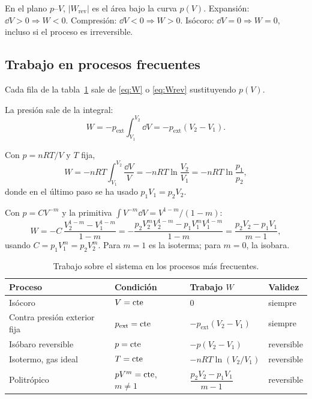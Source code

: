 \begin{observacion}
En el plano $p$--$V$, $|W_{\mathrm{rev}}|$ es el área bajo la curva $p(V)$. Expansión: $\dd V>0\Rightarrow W<0$.
Compresión: $\dd V<0\Rightarrow W>0$. Isócoro: $\dd V=0\Rightarrow W=0$, incluso si el proceso es irreversible.
\end{observacion}

\subsection{Trabajo en procesos frecuentes}

Cada fila de la tabla~\ref{tab:trabajos} sale de \eqref{eq:W} o \eqref{eq:Wrev} sustituyendo $p(V)$.

 La presión sale de la integral:
\[
  W=-p_{\mathrm{ext}}\int_{V_1}^{V_2}\dd V=-p_{\mathrm{ext}}(V_2-V_1).
\]

 Con $p=nRT/V$ y $T$ fija,
\[
  W=-nRT\int_{V_1}^{V_2}\frac{\dd V}{V}=-nRT\ln\frac{V_2}{V_1}=-nRT\ln\frac{p_1}{p_2},
\]
donde en el último paso se ha usado $p_1V_1=p_2V_2$.

 Con $p=CV^{-m}$ y la primitiva $\int V^{-m}\dd V=V^{1-m}/(1-m)$:
\[
  W=-C\,\frac{V_2^{1-m}-V_1^{1-m}}{1-m}
   =-\frac{p_2V_2^{m}V_2^{1-m}-p_1V_1^{m}V_1^{1-m}}{1-m}
   =\frac{p_2V_2-p_1V_1}{m-1},
\]
usando $C=p_1V_1^m=p_2V_2^m$. Para $m=1$ es la isoterma; para $m=0$, la isobara.

\begin{table}[htbp]
\centering
\caption{Trabajo sobre el sistema en los procesos más frecuentes.}
\label{tab:trabajos}
\small
\renewcommand{\arraystretch}{1.55}
\begin{tabular}{llll}
\toprule
Proceso & Condición & Trabajo $W$ & Validez\\
\midrule
Isócoro & $V=\mathrm{cte}$ & $0$ & siempre\\
Contra presión exterior fija & $p_{\mathrm{ext}}=\mathrm{cte}$ & $-p_{\mathrm{ext}}(V_2-V_1)$ & siempre\\
Isóbaro reversible & $p=\mathrm{cte}$ & $-p(V_2-V_1)$ & reversible\\
Isotermo, gas ideal & $T=\mathrm{cte}$ & $-nRT\ln(V_2/V_1)$ & reversible\\
Politrópico & $pV^m=\mathrm{cte}$, $m\neq1$ & $\dfrac{p_2V_2-p_1V_1}{m-1}$ & reversible\\
\bottomrule
\end{tabular}
\end{table}

